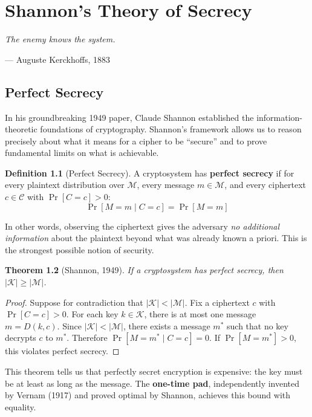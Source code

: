 \documentclass[12pt,a4paper,openany]{book}
\theoremstyle{definition}
\newtheorem{definition}{Definition}[chapter]
\theoremstyle{plain}
\newtheorem{theorem}[definition]{Theorem}
\begin{document}
\chapter{Shannon's Theory of Secrecy}

\epigraph{\textit{The enemy knows the system.}}{--- Auguste Kerckhoffs, 1883}

\section{Perfect Secrecy}

In his groundbreaking 1949 paper, Claude Shannon established the information-theoretic foundations of cryptography. Shannon's framework allows us to reason precisely about what it means for a cipher to be ``secure'' and to prove fundamental limits on what is achievable.

\begin{definition}[Perfect Secrecy]
A cryptosystem has \textbf{perfect secrecy} if for every plaintext distribution over $\mathcal{M}$, every message $m \in \mathcal{M}$, and every ciphertext $c \in \mathcal{C}$ with $\Pr[C = c] > 0$:
\begin{equation}
  \Pr[M = m \mid C = c] = \Pr[M = m]
\end{equation}
\end{definition}

In other words, observing the ciphertext gives the adversary \textit{no additional information} about the plaintext beyond what was already known a priori. This is the strongest possible notion of security.

\begin{theorem}[Shannon, 1949]
If a cryptosystem has perfect secrecy, then $|\mathcal{K}| \geq |\mathcal{M}|$.
\end{theorem}

\begin{proof}
Suppose for contradiction that $|\mathcal{K}| < |\mathcal{M}|$. Fix a ciphertext $c$ with $\Pr[C = c] > 0$. For each key $k \in \mathcal{K}$, there is at most one message $m = D(k, c)$. Since $|\mathcal{K}| < |\mathcal{M}|$, there exists a message $m^*$ such that no key decrypts $c$ to $m^*$. Therefore $\Pr[M = m^* \mid C = c] = 0$. If $\Pr[M = m^*] > 0$, this violates perfect secrecy.
\end{proof}

This theorem tells us that perfectly secret encryption is expensive: the key must be at least as long as the message. The \textbf{one-time pad}, independently invented by Vernam (1917) and proved optimal by Shannon, achieves this bound with equality.
\end{document}
